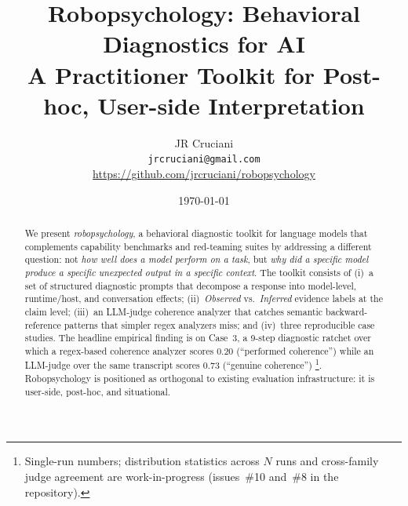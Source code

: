 \documentclass[11pt,letterpaper]{article}
\title{Robopsychology: Behavioral Diagnostics for AI \\
       \large A Practitioner Toolkit for Post-hoc, User-side Interpretation}
\author{JR Cruciani \\
        \texttt{jrcruciani@gmail.com} \\
        \url{https://github.com/jrcruciani/robopsychology}}
\date{\today}
\begin{document}
\maketitle

\begin{abstract}
We present \emph{robopsychology}, a behavioral diagnostic toolkit for
language models that complements capability benchmarks and red-teaming
suites by addressing a different question: not \emph{how well does a
model perform on a task}, but \emph{why did a specific model produce a
specific unexpected output in a specific context}. The toolkit consists
of (i)~a set of structured diagnostic prompts that decompose a response
into model-level, runtime/host, and conversation effects;
(ii)~\emph{Observed} vs.\ \emph{Inferred} evidence labels at the
claim level; (iii)~an LLM-judge coherence analyzer that catches
semantic backward-reference patterns that simpler regex analyzers miss;
and (iv)~three reproducible case studies. The headline empirical finding
is on Case~3, a 9-step diagnostic ratchet over which a regex-based
coherence analyzer scores 0.20 (``performed coherence'') while an
LLM-judge over the same transcript scores 0.73 (``genuine coherence'')
\citep{robopsych_repo}\footnote{Single-run numbers; distribution
statistics across $N$ runs and cross-family judge agreement are
work-in-progress (issues~\#10 and~\#8 in the repository).}.
Robopsychology is positioned as orthogonal to existing evaluation
infrastructure: it is user-side, post-hoc, and situational.
\end{abstract}












\appendix



\end{document}

